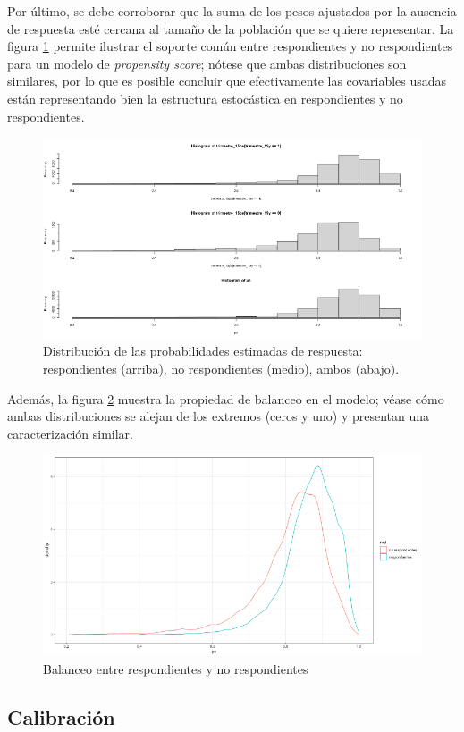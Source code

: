 \documentclass[
  12pt,
]{book}
\begin{document}
Por último, se debe corroborar que la suma de los pesos ajustados por la ausencia de respuesta esté cercana al tamaño de la población que se quiere representar. La figura \ref{fig:figel3a} permite ilustrar el soporte común entre respondientes y no respondientes para un modelo de \emph{propensity score}; nótese que ambas distribuciones son similares, por lo que es posible concluir que efectivamente las covariables usadas están representando bien la estructura estocástica en respondientes y no respondientes.

\begin{figure}

{\centering \includegraphics[width=0.5\linewidth]{Pics/el3a} 

}

\caption{Distribución de las probabilidades estimadas de respuesta: respondientes (arriba), no respondientes (medio), ambos (abajo).}\label{fig:figel3a}
\end{figure}

Además, la figura \ref{fig:figel3b} muestra la propiedad de balanceo en el modelo; véase cómo ambas distribuciones se alejan de los extremos (ceros y uno) y presentan una caracterización similar.

\begin{figure}

{\centering \includegraphics[width=0.5\linewidth]{Pics/el3b} 

}

\caption{Balanceo entre respondientes y no respondientes}\label{fig:figel3b}
\end{figure}

\hypertarget{calibraciuxf3n}{%
\subsection{Calibración}\label{calibraciuxf3n}}
\end{document}
